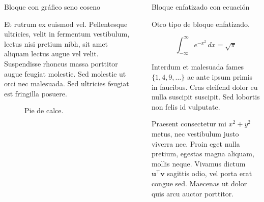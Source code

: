 \documentclass[final]{beamer}
\newlength{\sepwidth}
\newlength{\colwidth}
\newlength{\centralcolwidth}
\newcommand{\separatorcolumn}{\begin{column}{\sepwidth}\end{column}}
\begin{document}
\begin{frame}[t]
\begin{columns}[t]
\begin{column}{\centralcolwidth}
  \begin{block}{Bloque con gráfico seno coseno}

    Et rutrum ex euismod vel. Pellentesque ultricies, velit in fermentum
    vestibulum, lectus nisi pretium nibh, sit amet aliquam lectus augue vel
    velit. Suspendisse rhoncus massa porttitor augue feugiat molestie. Sed
    molestie ut orci nec malesuada. Sed ultricies feugiat est fringilla
    posuere.

    \begin{figure}
      \centering
      \caption{Pie de calce.}
    \end{figure}

  \end{block}

\end{column}

\separatorcolumn

\begin{column}{\colwidth}

  \begin{exampleblock}{Bloque enfatizado con ecuación}

    Otro tipo de bloque enfatizado.

    $$
    \int_{-\infty}^{\infty} e^{-x^2}\,dx = \sqrt{\pi}
    $$

    Interdum et malesuada fames $\{1, 4, 9, \ldots\}$ ac ante ipsum primis in
    faucibus. Cras eleifend dolor eu nulla suscipit suscipit. Sed lobortis non
    felis id vulputate.


    Praesent consectetur mi $x^2 + y^2$ metus, nec vestibulum justo viverra
    nec. Proin eget nulla pretium, egestas magna aliquam, mollis neque. Vivamus
    dictum $\mathbf{u}^\intercal\mathbf{v}$ sagittis odio, vel porta erat
    congue sed. Maecenas ut dolor quis arcu auctor porttitor.



\end{exampleblock}
\end{column}
\end{columns}
\end{frame}
\end{document}
